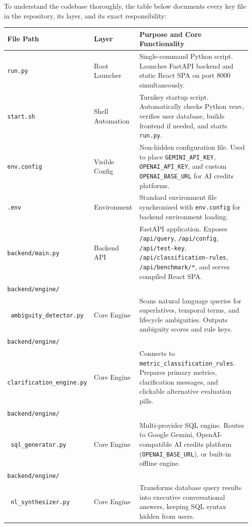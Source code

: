 \documentclass[10pt,a4paper]{article}
\begin{document}
To understand the codebase thoroughly, the table below documents every key file in the repository, its layer, and its exact responsibility:

\small
\begin{tabularx}{\textwidth}{l p{3.2cm} X}
\toprule
\textbf{File Path} & \textbf{Layer} & \textbf{Purpose and Core Functionality} \\
\midrule
\texttt{run.py} & Root Launcher & Single-command Python script. Launches FastAPI backend and static React SPA on port 8000 simultaneously. \\
\addlinespace
\texttt{start.sh} & Shell Automation & Turnkey startup script. Automatically checks Python venv, verifies user database, builds frontend if needed, and starts \texttt{run.py}. \\
\addlinespace
\texttt{env.config} & Visible Config & Non-hidden configuration file. Used to place \texttt{GEMINI\_API\_KEY}, \texttt{OPENAI\_API\_KEY}, and custom \texttt{OPENAI\_BASE\_URL} for AI credits platforms. \\
\addlinespace
\texttt{.env} & Environment & Standard environment file synchronized with \texttt{env.config} for backend environment loading. \\
\addlinespace
\texttt{backend/main.py} & Backend API & FastAPI application. Exposes \texttt{/api/query}, \texttt{/api/config}, \texttt{/api/test-key}, \texttt{/api/classification-rules}, \texttt{/api/benchmark/*}, and serves compiled React SPA. \\
\addlinespace
\texttt{backend/engine/} \\
\texttt{  ambiguity\_detector.py} & Core Engine & Scans natural language queries for superlatives, temporal terms, and lifecycle ambiguities. Outputs ambiguity scores and rule keys. \\
\addlinespace
\texttt{backend/engine/} \\
\texttt{  clarification\_engine.py} & Core Engine & Connects to \texttt{metric\_classification\_rules}. Prepares primary metrics, clarification messages, and clickable alternative evaluation pills. \\
\addlinespace
\texttt{backend/engine/} \\
\texttt{  sql\_generator.py} & Core Engine & Multi-provider SQL engine. Routes to Google Gemini, OpenAI-compatible AI credits platform (\texttt{OPENAI\_BASE\_URL}), or built-in offline engine. \\
\addlinespace
\texttt{backend/engine/} \\
\texttt{  nl\_synthesizer.py} & Core Engine & Transforms database query results into executive conversational answers, keeping SQL syntax hidden from users. \\

\end{tabularx}
\end{document}
